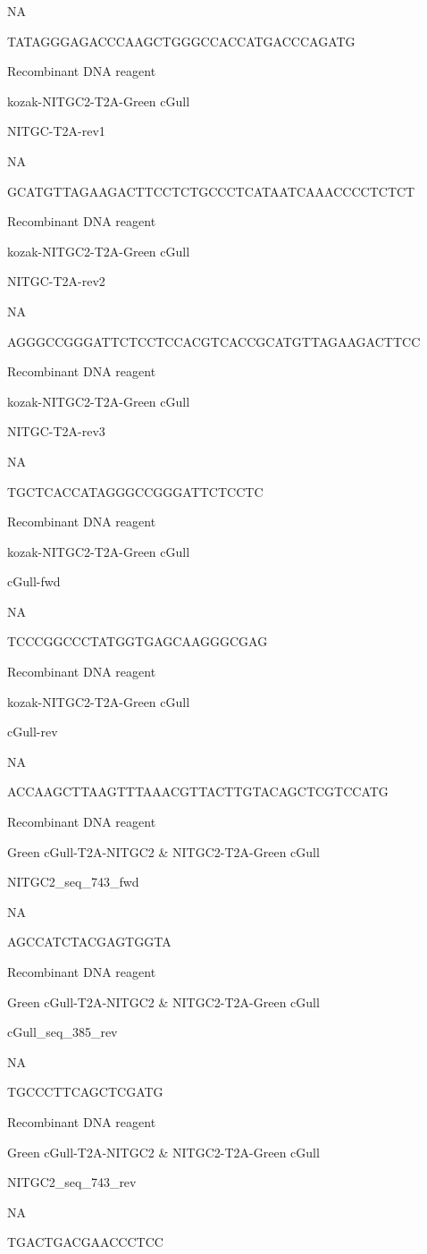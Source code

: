 \documentclass[
  10pt,
  onecolumn]{article}
\begin{document}
NA

TATAGGGAGACCCAAGCTGGGCCACCATGACCCAGATG

Recombinant DNA reagent

kozak-NITGC2-T2A-Green cGull

NITGC-T2A-rev1

NA

GCATGTTAGAAGACTTCCTCTGCCCTCATAATCAAACCCCTCTCT

Recombinant DNA reagent

kozak-NITGC2-T2A-Green cGull

NITGC-T2A-rev2

NA

AGGGCCGGGATTCTCCTCCACGTCACCGCATGTTAGAAGACTTCC

Recombinant DNA reagent

kozak-NITGC2-T2A-Green cGull

NITGC-T2A-rev3

NA

TGCTCACCATAGGGCCGGGATTCTCCTC

Recombinant DNA reagent

kozak-NITGC2-T2A-Green cGull

cGull-fwd

NA

TCCCGGCCCTATGGTGAGCAAGGGCGAG

Recombinant DNA reagent

kozak-NITGC2-T2A-Green cGull

cGull-rev

NA

ACCAAGCTTAAGTTTAAACGTTACTTGTACAGCTCGTCCATG

Recombinant DNA reagent

Green cGull-T2A-NITGC2 \& NITGC2-T2A-Green cGull

NITGC2\_seq\_743\_fwd

NA

AGCCATCTACGAGTGGTA

Recombinant DNA reagent

Green cGull-T2A-NITGC2 \& NITGC2-T2A-Green cGull

cGull\_seq\_385\_rev

NA

TGCCCTTCAGCTCGATG

Recombinant DNA reagent

Green cGull-T2A-NITGC2 \& NITGC2-T2A-Green cGull

NITGC2\_seq\_743\_rev

NA

TGACTGACGAACCCTCC
\end{document}
